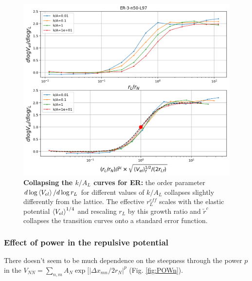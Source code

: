 \documentclass[12pt]{article}%
\newcommand{\outNim}[1]{}
\begin{document}
\begin{figure}
    \centering
    \includegraphics[width=.7\textwidth]{fig-09-19/ER-kA-scaled-fit.png}
    \caption{\scriptsize {\bf Collapsing the $k/A_L$ curves for ER:} the order parameter $d\log \left<V_{el}\right> /d \log r_L $ for different values of $k/A_L$ collapses slightly differently from the lattice. 
    The effective $r_L^{eff}$ scales with the elastic potential $\left<V_{el}\right>^{1/4}$ and rescaling $r_L$ by this growth ratio and $\tilde{r}^c$ collapses the transition curves onto a standard error function.}
    \label{fig:l-kA-er}
\end{figure}

\subsubsection{Effect of power in the repulsive potential}
There doesn't seem to be much dependence on the steepness through the power $p$ in the $V_{NN} = \sum_{n,m} A_N \exp[|\Delta x_{mn}/2 r_N|^p $ (Fig. \ref{fig:POWn}).
\end{document}
